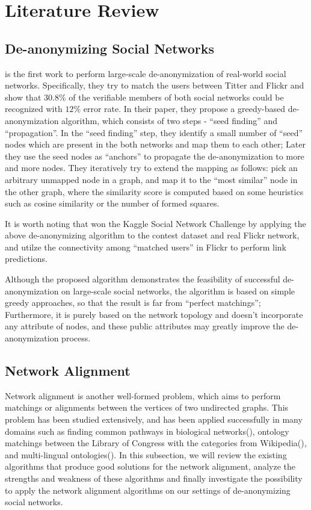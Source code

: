 \documentclass[11pt,letterpaper]{article}
\begin{document}
\section{Literature Review}

\subsection{De-anonymizing Social Networks}

\cite{Narayanan2009} is the first work to perform large-scale de-anonymization of real-world social networks. Specifically, they try to match the users between Titter and Flickr and show that $30.8\%$ of the verifiable members of both social networks could be recognized with $12\%$ error rate. In their paper, they propose a greedy-based de-anonymization algorithm, which consists of two steps - ``seed finding'' and ``propagation''. In the ``seed finding'' step, they identify a small number of ``seed'' nodes which are present in the both networks and map them to each other; Later they use the seed nodes as ``anchors'' to propagate the de-anonymization to more and more nodes. They iteratively try to extend the mapping as follows: pick an arbitrary unmapped node in a graph, and map it to the ``most similar'' node in the other graph, where the similarity score is computed based on some heuristics such as cosine similarity or the number of formed squares.

It is worth noting that \cite{Narayanan2011} won the Kaggle Social Network Challenge by applying the above de-anonymizing algorithm to the contest dataset and real Flickr network, and utilze the connectivity among ``matched users'' in Flickr to perform link predictions. 

Although the proposed algorithm demonstrates the feasibility of successful de-anonymization on large-scale social networks, the algorithm is based on simple greedy approaches, so that the result is far from ``perfect matchings''; Furthermore, it is purely based on the network topology and doesn't incorporate any attribute of nodes, and these public attributes may greatly improve the de-anonymization process.

\subsection{Network Alignment}
Network alignment is another well-formed problem, which aims to perform matchings or alignments between the vertices of two undirected graphs. This problem has been studied extensively, and has been applied successfully in many domains such as finding common pathways in biological networks(\cite{Singh2007, Singh2008, Liao2009}), ontology matchings between the Library of Congress with the categories from Wikipedia(\cite{Bayati2009}), and multi-lingual ontologies(\cite{Kreitmann2011, Bayati2009a}). In this subsection, we will review the existing algorithms that produce good solutions for the network alignment, analyze the strengths and weakness of these algorithms and finally investigate the possibility to apply the network alignment algorithms on our settings of de-anonymizing social networks.
 
\end{document}
